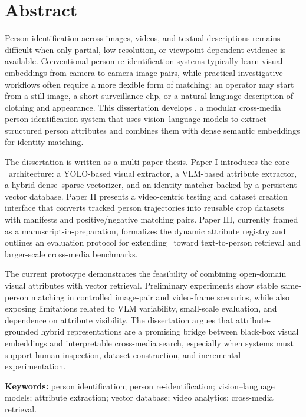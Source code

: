 \chapter*{Abstract}

Person identification across images, videos, and textual descriptions remains difficult when only partial, low-resolution, or viewpoint-dependent evidence is available. Conventional person re-identification systems typically learn visual embeddings from camera-to-camera image pairs, while practical investigative workflows often require a more flexible form of matching: an operator may start from a still image, a short surveillance clip, or a natural-language description of clothing and appearance. This dissertation develops \systemname, a modular cross-media person identification system that uses vision--language models to extract structured person attributes and combines them with dense semantic embeddings for identity matching.

The dissertation is written as a multi-paper thesis. Paper I introduces the core \systemname\ architecture: a YOLO-based visual extractor, a VLM-based attribute extractor, a hybrid dense--sparse vectorizer, and an identity matcher backed by a persistent vector database. Paper II presents a video-centric testing and dataset creation interface that converts tracked person trajectories into reusable crop datasets with manifests and positive/negative matching pairs. Paper III, currently framed as a manuscript-in-preparation, formalizes the dynamic attribute registry and outlines an evaluation protocol for extending \systemname\ toward text-to-person retrieval and larger-scale cross-media benchmarks.

The current prototype demonstrates the feasibility of combining open-domain visual attributes with vector retrieval. Preliminary experiments show stable same-person matching in controlled image-pair and video-frame scenarios, while also exposing limitations related to VLM variability, small-scale evaluation, and dependence on attribute visibility. The dissertation argues that attribute-grounded hybrid representations are a promising bridge between black-box visual embeddings and interpretable cross-media search, especially when systems must support human inspection, dataset construction, and incremental experimentation.

\vspace{1em}
\noindent\textbf{Keywords:} person identification; person re-identification; vision--language models; attribute extraction; vector database; video analytics; cross-media retrieval.
